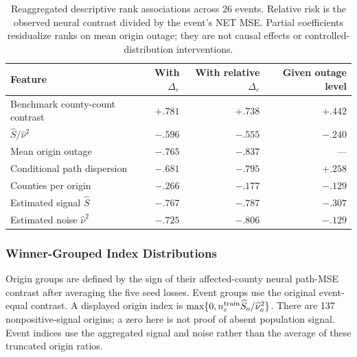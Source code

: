 \begin{table}[htbp]
\centering\small
\caption{Reaggregated descriptive rank associations across 26 events. Relative risk is the observed neural contrast divided by the event's NET MSE. Partial coefficients residualize ranks on mean origin outage; they are not causal effects or controlled-distribution interventions.}
\begin{tabular}{@{}lrrr@{}}\toprule
Feature & With $\Delta_e$ & With relative $\Delta_e$ & Given outage level\\\midrule
Benchmark county-count contrast & $+.781$ & $+.738$ & $+.442$\\
$\widehat S/\widehat\nu^2$ & $-.596$ & $-.555$ & $-.240$\\
Mean origin outage & $-.765$ & $-.837$ & ---\\
Conditional path dispersion & $-.681$ & $-.795$ & $+.258$\\
Counties per origin & $-.266$ & $-.177$ & $-.129$\\
Estimated signal $\widehat S$ & $-.767$ & $-.787$ & $-.307$\\
Estimated noise $\widehat\nu^2$ & $-.725$ & $-.806$ & $-.129$\\\bottomrule
\end{tabular}
\end{table}

\subsubsection{Winner-Grouped Index Distributions}
Origin groups are defined by the sign of their affected-county neural path-MSE contrast after averaging the five seed losses. Event groups use the original event-equal contrast. A displayed origin index is $\max\{0,n_e^{\rm train}\widehat S_o/\widehat\nu_o^2\}$. There are 137 nonpositive-signal origins; a zero here is not proof of absent population signal. Event indices use the aggregated signal and noise rather than the average of these truncated origin ratios.

